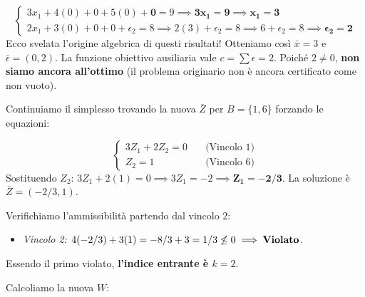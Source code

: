 \documentclass[12pt, a4paper]{article}
\begin{document}
	$$\begin{cases} 3x_1 + 4(0) + 0 + 5(0) + \mathbf{0} = 9 \implies \mathbf{3x_1 = 9 \implies x_1 = 3} \\ 2x_1 + 3(0) + 0 + 0 + \epsilon_2 = 8 \implies 2(3) + \epsilon_2 = 8 \implies 6 + \epsilon_2 = 8 \implies \mathbf{\epsilon_2 = 2} \end{cases}$$
	Ecco svelata l'origine algebrica di questi risultati! Otteniamo così $\bar{x} = 3$ e $\bar{\epsilon} = (0, 2)$. La funzione obiettivo ausiliaria vale $c = \sum \epsilon = 2$. Poiché $2 \neq 0$, \textbf{non siamo ancora all'ottimo} (il problema originario non è ancora certificato come non vuoto).
	
	Continuiamo il simplesso trovando la nuova $\bar{Z}$ per $B=\{1, 6\}$ forzando le equazioni:
	
	$$\begin{cases} 3Z_1 + 2Z_2 = 0 \quad &\text{(Vincolo 1)} \\ Z_2 = 1 \quad &\text{(Vincolo 6)} \end{cases}$$
	Sostituendo $Z_2$: $3Z_1 + 2(1) = 0 \implies 3Z_1 = -2 \implies \mathbf{Z_1 = -2/3}$.
	La soluzione è $\bar{Z} = (-2/3, 1)$.
	
	Verifichiamo l'ammissibilità partendo dal vincolo 2:
	\begin{itemize}[label=$\circ$, itemsep=2pt, leftmargin=1.5cm]
		\item \textit{Vincolo 2:} $4(-2/3) + 3(1) = -8/3 + 3 = 1/3 \not\leq 0 \implies \text{\textbf{Violato}}$.
	\end{itemize}
	Essendo il primo violato, \textbf{l'indice entrante è $k = 2$}.
	
	Calcoliamo la nuova $W$:
	
\end{document}
